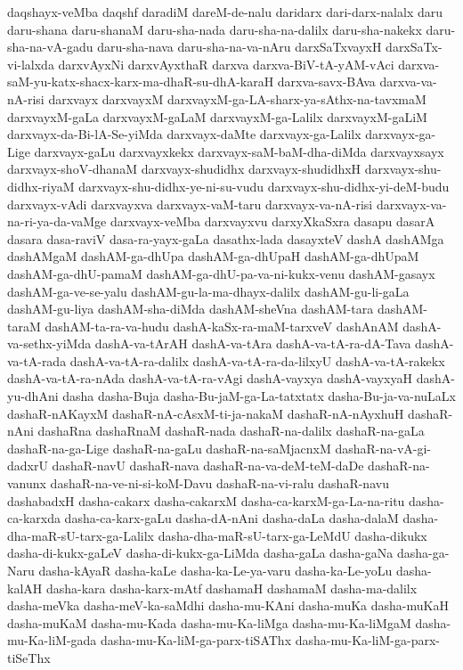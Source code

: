 {daqshayx-veMba
daqshf
daradiM
dareM-de-nalu
daridarx
dari-darx-nalalx
daru
daru-shana
daru-shanaM
daru-sha-nada
daru-sha-na-dalilx
daru-sha-nakekx
daru-sha-na-vA-gadu
daru-sha-nava
daru-sha-na-va-nAru
darxSaTxvayxH
darxSaTx-vi-lalxda
darxvAyxNi
darxvAyxthaR
darxva
darxva-BiV-tA-yAM-vAci
darxva-saM-yu-katx-shacx-karx-ma-dhaR-su-dhA-karaH
darxva-savx-BAva
darxva-va-nA-risi
darxvayx
darxvayxM
darxvayxM-ga-LA-sharx-ya-sAthx-na-tavxmaM
darxvayxM-gaLa
darxvayxM-gaLaM
darxvayxM-ga-Lalilx
darxvayxM-gaLiM
darxvayx-da-Bi-lA-Se-yiMda
darxvayx-daMte
darxvayx-ga-Lalilx
darxvayx-ga-Lige
darxvayx-gaLu
darxvayxkekx
darxvayx-saM-baM-dha-diMda
darxvayxsayx
darxvayx-shoV-dhanaM
darxvayx-shudidhx
darxvayx-shudidhxH
darxvayx-shu-didhx-riyaM
darxvayx-shu-didhx-ye-ni-su-vudu
darxvayx-shu-didhx-yi-deM-budu
darxvayx-vAdi
darxvayxva
darxvayx-vaM-taru
darxvayx-va-nA-risi
darxvayx-va-na-ri-ya-da-vaMge
darxvayx-veMba
darxvayxvu
darxyXkaSxra
dasapu
dasarA
dasara
dasa-raviV
dasa-ra-yayx-gaLa
dasathx-lada
dasayxteV
dashA
dashAMga
dashAMgaM
dashAM-ga-dhUpa
dashAM-ga-dhUpaH
dashAM-ga-dhUpaM
dashAM-ga-dhU-pamaM
dashAM-ga-dhU-pa-va-ni-kukx-venu
dashAM-gasayx
dashAM-ga-ve-se-yalu
dashAM-gu-la-ma-dhayx-dalilx
dashAM-gu-li-gaLa
dashAM-gu-liya
dashAM-sha-diMda
dashAM-sheVna
dashAM-tara
dashAM-taraM
dashAM-ta-ra-va-hudu
dashA-kaSx-ra-maM-tarxveV
dashAnAM
dashA-va-sethx-yiMda
dashA-va-tArAH
dashA-va-tAra
dashA-va-tA-ra-dA-Tava
dashA-va-tA-rada
dashA-va-tA-ra-dalilx
dashA-va-tA-ra-da-lilxyU
dashA-va-tA-rakekx
dashA-va-tA-ra-nAda
dashA-va-tA-ra-vAgi
dashA-vayxya
dashA-vayxyaH
dashA-yu-dhAni
dasha
dasha-Buja
dasha-Bu-jaM-ga-La-tatxtatx
dasha-Bu-ja-va-nuLaLx
dashaR-nAKayxM
dashaR-nA-cAsxM-ti-ja-nakaM
dashaR-nA-nAyxhuH
dashaR-nAni
dashaRna
dashaRnaM
dashaR-nada
dashaR-na-dalilx
dashaR-na-gaLa
dashaR-na-ga-Lige
dashaR-na-gaLu
dashaR-na-saMjacnxM
dashaR-na-vA-gi-dadxrU
dashaR-navU
dashaR-nava
dashaR-na-va-deM-teM-daDe
dashaR-na-vanunx
dashaR-na-ve-ni-si-koM-Davu
dashaR-na-vi-ralu
dashaR-navu
dashabadxH
dasha-cakarx
dasha-cakarxM
dasha-ca-karxM-ga-La-na-ritu
dasha-ca-karxda
dasha-ca-karx-gaLu
dasha-dA-nAni
dasha-daLa
dasha-dalaM
dasha-dha-maR-sU-tarx-ga-Lalilx
dasha-dha-maR-sU-tarx-ga-LeMdU
dasha-dikukx
dasha-di-kukx-gaLeV
dasha-di-kukx-ga-LiMda
dasha-gaLa
dasha-gaNa
dasha-ga-Naru
dasha-kAyaR
dasha-kaLe
dasha-ka-Le-ya-varu
dasha-ka-Le-yoLu
dasha-kalAH
dasha-kara
dasha-karx-mAtf
dashamaH
dashamaM
dasha-ma-dalilx
dasha-meVka
dasha-meV-ka-saMdhi
dasha-mu-KAni
dasha-muKa
dasha-muKaH
dasha-muKaM
dasha-mu-Kada
dasha-mu-Ka-liMga
dasha-mu-Ka-liMgaM
dasha-mu-Ka-liM-gada
dasha-mu-Ka-liM-ga-parx-tiSAThx
dasha-mu-Ka-liM-ga-parx-tiSeThx
}
